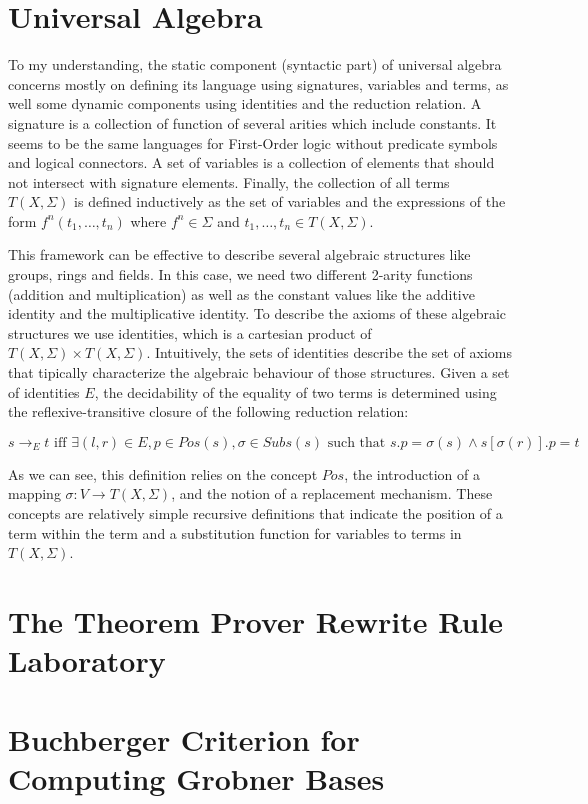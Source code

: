 \documentclass[a4paper, 11pt]{article}
\begin{document}
\section{Universal Algebra}

To my understanding, the static component (syntactic part) of universal algebra concerns mostly on defining its language using signatures, variables and terms, as well some dynamic components using identities and the reduction relation. A signature is a collection of function of several arities which include constants. It seems to be the same languages for First-Order logic without predicate symbols and logical connectors. A set of variables is a collection of elements that should not intersect with signature elements. Finally, the collection of all terms $T(X, \Sigma)$ is defined inductively as the set of variables and the expressions of the form $f^{n}(t_1, \dots, t_n)$ where $f^{n} \in \Sigma$ and $t_1, \dots, t_n \in T(X, \Sigma)$.

This framework can be effective to describe several algebraic structures like groups, rings and fields. In this case, we need two different 2-arity functions (addition and multiplication) as well as the constant values like the additive identity and the multiplicative identity. To describe the axioms of these algebraic structures we use identities, which is a cartesian product of  $T(X, \Sigma) \times T(X, \Sigma)$. Intuitively, the sets of identities describe the set of axioms that tipically characterize the algebraic behaviour of those structures. Given a set of identities $E$, the decidability of the equality of two terms is determined using the reflexive-transitive closure of the following reduction relation:

\begin{equation*}
  s \rightarrow_E t \text{ iff } \exists (l, r) \in E, p \in Pos(s), \sigma \in Subs(s) \text{ such that } s.p = \sigma(s) \land s[\sigma(r)].p = t 
\end{equation*}

As we can see, this definition relies on the concept $Pos$, the introduction of a mapping $\sigma : V \rightarrow T(X, \Sigma)$, and the notion of a replacement mechanism. These concepts are relatively simple recursive definitions that indicate the position of a term within the term and a substitution function for variables to terms in $T(X, \Sigma)$. 

\section{The Theorem Prover Rewrite Rule Laboratory}

\section{Buchberger Criterion for Computing Grobner Bases}



\end{document}
